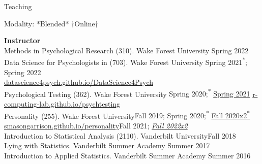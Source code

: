 \begin{rSection}{\textrm{Teaching}}
\vspace*{2pt}
\vspace{-1mm}\begin{center}\footnotesize{Modality: *Blended* $\dagger$Online$\dagger$}\end{center}\vspace{-4mm}
{\large  \bf Instructor}\\
Methods in Psychological Research (310). Wake Forest University \hfill {Spring 2022}\smallskip\\
Data Science for Psychologists in \R (703). Wake Forest University   \hfill{Spring 2021\textsuperscript{*}; Spring 2022}\\
\hspace* {6 mm}\href{https://datascience4psych.github.io/DataScience4Psych/}{\color{blue} datascience4psych.github.io/DataScience4Psych}\smallskip\\
Psychological Testing  (362). Wake Forest University \hfill{Spring 2020;\textsuperscript{*} \href{https://www.youtube.com/playlist?list=PLKrrdtYgOUYYgag4erySD7L0jDcZGMlS_}{\color{blue}Spring 2021\noteBns}}
\hspace* {6 mm} \href{https://r-computing-lab.github.io/psychtesting/}{\color{blue} r-computing-lab.github.io/psychtesting}\smallskip\\
Personality (255). Wake Forest University\hfill{Fall 2019; Spring 2020;\textsuperscript{*} \href{https://www.youtube.com/playlist?list=PLKrrdtYgOUYZpENpYddjG8n_q3bfbx8Kr}{\color{blue}Fall 2020x2\textsuperscript{*}\noteBns}}
\hspace* {6 mm} \href{https://smasongarrison.github.io/personality/}{\color{blue} smasongarrison.github.io/personality}\hfill{Fall 2021; \textit{\href{https://www.youtube.com/playlist?list=PLKrrdtYgOUYZpENpYddjG8n_q3bfbx8Kr}{Fall 2022x2\noteBns}}}\smallskip\\
Introduction to Statistical Analysis (2110). Vanderbilt University\hfill {Fall 2018}\smallskip\\
Lying with Statistics. Vanderbilt Summer Academy \hfill{Summer 2017}\smallskip\\
Introduction to Applied Statistics. Vanderbilt Summer Academy \hfill{Summer 2016}\smallskip\\

\end{rSection}
